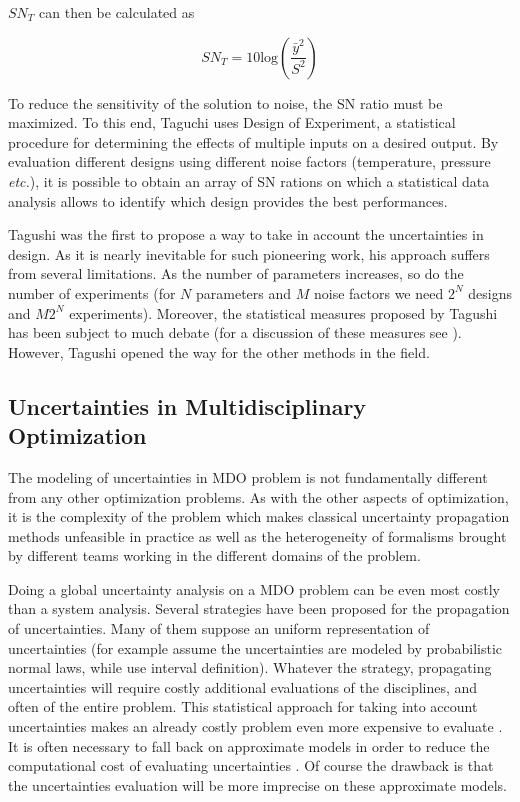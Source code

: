  $SN_T$ can then be calculated as
 
 $$SN_T = 10\text{log}\left(\frac{\bar{y}^2}{S^2}\right)$$
 
To reduce the sensitivity of the solution to noise, the SN ratio must be maximized. To this end, Taguchi uses Design of Experiment\cite{sacks1989design}, a statistical procedure for determining the effects of multiple inputs on a desired output. By evaluation different designs using different noise factors (temperature, pressure \emph{etc.}), it is possible to obtain an array of SN rations on which a statistical data analysis allows to identify which design provides the best performances.

Tagushi was the first to propose a way to take in account the uncertainties in design. As it is nearly inevitable for such pioneering work, his approach suffers from several limitations. As the number of parameters increases, so do the number of experiments (for $N$ parameters and $M$ noise factors we need $2^N$ designs and $M2^N$ experiments). Moreover, the statistical measures proposed by Tagushi has been subject to much debate (for a discussion of these measures see \cite{nair1992taguchi}). However, Tagushi opened the way for the other methods in the field.

\subsection{Uncertainties in Multidisciplinary Optimization}

The modeling of uncertainties in MDO problem is not fundamentally different from any other optimization problems. As with the other aspects of optimization, it is the complexity of the problem which makes classical uncertainty propagation methods unfeasible in practice as well as the heterogeneity of formalisms brought by different teams working in the different domains of the problem.

Doing a global uncertainty analysis on a MDO problem can be even most costly than a system analysis. Several strategies have been proposed for the propagation of uncertainties. Many of them suppose an uniform representation of uncertainties (for example \cite{du2005collaborative,liu2006probabilistic} assume the uncertainties are modeled by probabilistic normal laws, while \cite{gu2000worst,li2008multiobjective} use interval definition). Whatever the strategy, propagating uncertainties will require costly additional evaluations of the disciplines, and often of the entire problem. This statistical approach for taking into account uncertainties makes an already costly problem even more expensive to evaluate \cite{koch1999statistical}. It is often necessary to fall back on approximate models in order to reduce the computational cost of evaluating uncertainties \cite{allen2006robust}. Of course the drawback is that the uncertainties evaluation will be more imprecise on these approximate models.


